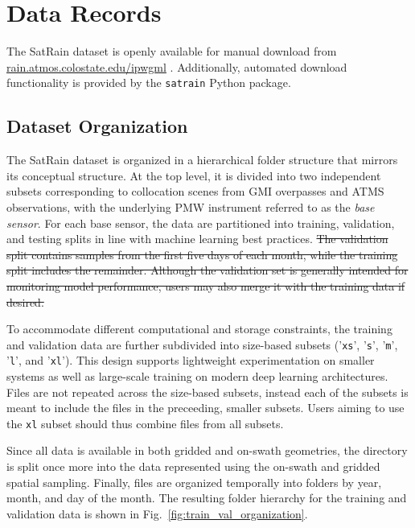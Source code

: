 \documentclass[11pt]{article}
\providecommand{\DIFdel}[1]{{\protect\color{red}\sout{#1}}}                      %
\providecommand{\DIFaddbegin}{} %
\providecommand{\DIFaddend}{} %
\providecommand{\DIFdelbegin}{} %
\providecommand{\DIFdelend}{} %
\begin{document}
\section{Data Records}

The SatRain dataset is openly available for manual download from
\DIFaddbegin \url{rain.atmos.colostate.edu/ipwgml} \DIFaddend \citep{SatRain2025}. Additionally,
automated download functionality is provided by the \texttt{satrain}
\citep{SatRainPython2025} Python package.


\subsection{Dataset Organization}

The SatRain dataset is organized in a hierarchical folder structure that mirrors
its conceptual structure. At the top level, it is divided into two independent
subsets corresponding to collocation scenes from GMI overpasses and ATMS
observations, with the underlying PMW instrument referred to as the \textit{base sensor}.
For each base sensor, the data are partitioned into training, validation, and
testing splits in line with machine learning best practices.
\DIFdelbegin \DIFdel{The validation
split contains samples from the first five days of each month, while the
training split includes the remainder. Although the validation set is generally
intended for monitoring model performance, users may also merge it with the
training data if desired.
}\DIFdelend 

To accommodate different computational and storage constraints, the training and
validation data are further subdivided into size-based subsets ('\texttt{xs}',
'\texttt{s}', '\texttt{m}', '\texttt{l}', and '\texttt{xl}'). This design
supports lightweight experimentation on smaller systems as well as large-scale
training on modern deep learning architectures. Files are not repeated across
the size-based subsets, instead each of the subsets is meant to include the
files in the preceeding, smaller subsets. Users aiming to use the \texttt{xl}
subset should thus combine files from all subsets.

Since all data is available in both gridded and on-swath geometries, the
directory is split once more into the data represented using the on-swath and
gridded spatial sampling. Finally, files are organized temporally into folders
by year, month, and day of the month. The resulting folder hierarchy for the
training and validation data is shown in Fig.~\ref{fig:train_val_organization}.
\end{document}

